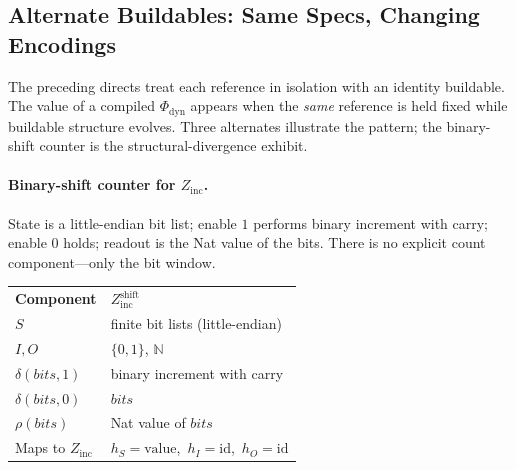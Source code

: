 \subsection{Alternate Buildables: Same Specs, Changing Encodings}
\label{sec:case-alternates}

The preceding directs treat each reference in isolation with an identity buildable. The value of a compiled $\Phi_{\mathrm{dyn}}$ appears when the \emph{same} reference is held fixed while buildable structure evolves. Three alternates illustrate the pattern; the binary-shift counter is the structural-divergence exhibit.

\paragraph{Binary-shift counter for $Z_{\mathrm{inc}}$.}
\label{sec:case-shift-counter}
State is a little-endian bit list; enable $1$ performs binary increment with carry; enable $0$ holds; readout is the Nat value of the bits. There is no explicit count component---only the bit window.

\begingroup
\renewcommand{\arraystretch}{1.2}
\footnotesize
\begin{center}
\begin{tabularx}{0.92\linewidth}{@{}>{\raggedright\arraybackslash}p{2.8cm}Y@{}}
    \headingfont\bfseries Component & \headingfont\bfseries $Z_{\mathrm{inc}}^{\mathrm{shift}}$ \\
    \addlinespace[2pt]
    $S$ & finite bit lists (little-endian) \\
    \addlinespace[2pt]
    $I,O$ & $\{0,1\}$, $\mathbb{N}$ \\
    \addlinespace[2pt]
    $\delta(\mathit{bits},1)$ & binary increment with carry \\
    \addlinespace[2pt]
    $\delta(\mathit{bits},0)$ & $\mathit{bits}$ \\
    \addlinespace[2pt]
    $\rho(\mathit{bits})$ & Nat value of $\mathit{bits}$ \\
    \addlinespace[2pt]
    Maps to $Z_{\mathrm{inc}}$ & $h_S=\mathrm{value}$,\ $h_I=\mathrm{id}$,\ $h_O=\mathrm{id}$ \\
\end{tabularx}
\end{center}
\label{tab:z-inc-shift}
\endgroup
\vspace{4pt}

